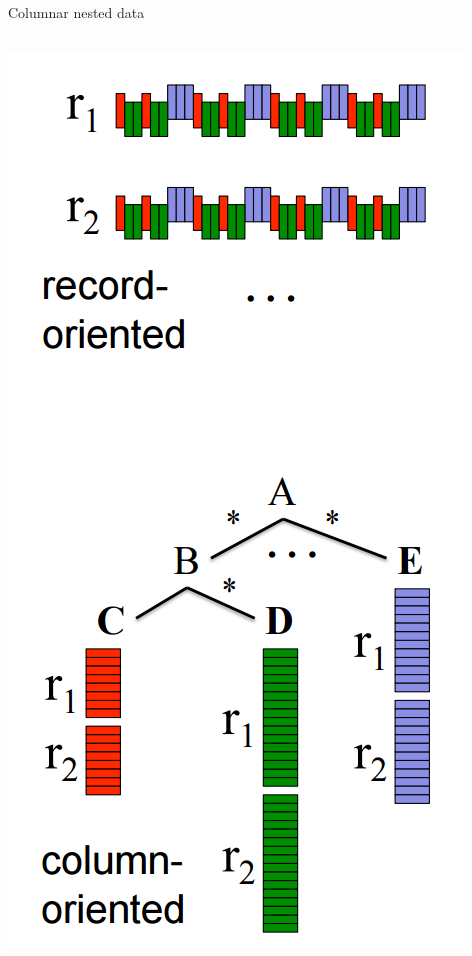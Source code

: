 \documentclass{beamer}
\begin{document}
\begin{frame}{Columnar nested data}
\begin{columns}
\includegraphics[width=\linewidth]{columnar.png}
\end{columns}
\end{frame}
\end{document}
